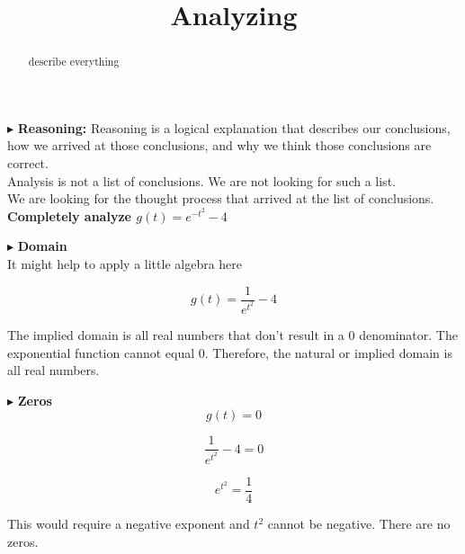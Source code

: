 \documentclass{ximera}
\title{Analyzing}
\begin{document}
\begin{abstract}
describe everything
\end{abstract}
\maketitle









$\blacktriangleright$ \textbf{\textcolor{red!80!black}{Reasoning:}} Reasoning is a logical explanation that describes our conclusions, how we arrived at those conclusions, and why we think those conclusions are correct. \\

Analysis is not a list of conclusions. We are not looking for such a list. \\

We are looking for the thought process that arrived at the list of conclusions. \\








\textbf{\textcolor{purple!85!blue}{Completely analyze $g(t) = e^{-t^2} - 4$}}

$\blacktriangleright$  \textbf{\textcolor{blue!55!black}{Domain}} \\


It might help to apply a little algebra here


\[
g(t) = \frac{1}{e^{t^2}} - 4
\]


The implied domain is all real numbers that don't result in a $0$ denominator. The exponential function cannot equal $0$.  Therefore, the natural or implied domain is all real numbers.







$\blacktriangleright$  \textbf{\textcolor{blue!55!black}{Zeros}} \\

\[
g(t) = 0
\]



\[
\frac{1}{e^{t^2}} - 4 = 0
\]


\[
e^{t^2} = \frac{1}{4}
\]


This would require a negative exponent and $t^2$ cannot be negative.  There are no zeros.
\end{document}
